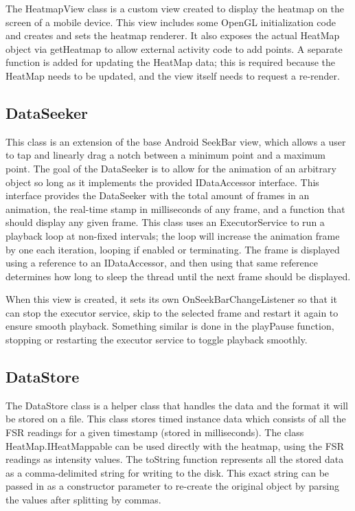 The HeatmapView class is a custom view created to display the heatmap on the screen of a mobile device. This view includes some OpenGL initialization code and creates and sets the heatmap renderer. It also exposes the actual HeatMap object via getHeatmap to allow external activity code to add points. A separate function is added for updating the HeatMap data; this is required because the HeatMap needs to be updated, and the view itself needs to request a re-render.
\subsection{DataSeeker}
This class is an extension of the base Android SeekBar view, which allows a user to tap and linearly drag a notch between a minimum point and a maximum point. The goal of the DataSeeker is to allow for the animation of an arbitrary object so long as it implements the provided IDataAccessor interface. This interface provides the DataSeeker with the total amount of frames in an animation, the real-time stamp in milliseconds of any frame, and a function that should display any given frame. This class uses an ExecutorService to run a playback loop at non-fixed intervals; the loop will increase the animation frame by one each iteration, looping if enabled or terminating. The frame is displayed using a reference to an IDataAccessor, and then using that same reference determines how long to sleep the thread until the next frame should be displayed. 

When this view is created, it sets its own OnSeekBarChangeListener so that it can stop the executor service, skip to the selected frame and restart it again to ensure smooth playback. Something similar is done in the playPause function, stopping or restarting the executor service to toggle playback smoothly.
\subsection{DataStore}
The DataStore class is a helper class that handles the data and the format it will be stored on a file. This class stores timed instance data which consists of all the FSR readings for a given timestamp (stored in milliseconds). The class HeatMap.IHeatMappable can be used directly with the heatmap, using the FSR readings as intensity values. The toString function represents all the stored data as a comma-delimited string for writing to the disk. This exact string can be passed in as a constructor parameter to re-create the original object by parsing the values after splitting by commas.
